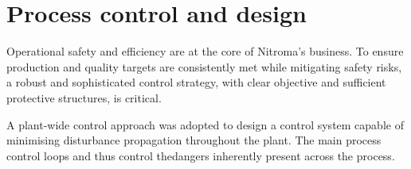 \section*{Process control and design}

Operational safety and efficiency are at the core of Nitroma's business. To ensure production and quality targets are consistently met while mitigating safety risks, a robust and sophisticated control strategy, with clear objective and sufficient protective structures, is critical.

A plant-wide control approach was adopted to design a control system capable of minimising disturbance propagation throughout the plant. The main process control loops and thus control thedangers inherently present across the process. 







